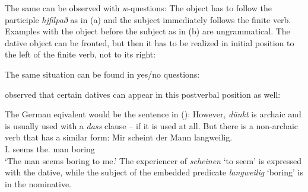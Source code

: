The same can be observed with \emph{w}-questions:
\eal
{}
\zl
The object has to follow the participle \emph{hjfilpað} as in (a) and the subject immediately
follows the finite verb. Examples with the object before the subject as in (b) are
ungrammatical. The dative object can be fronted, but then it has to be realized in initial position
to the left of the finite verb, not to its right:
\z

The same situation can be found in yes/no questions:
\eal
{}
\zl

\citet*[Section~2.3]{ZMT85a} observed that certain datives can appear in this postverbal position as well:

\eal
{}
\zl

The German eqivalent would be the sentence in ():
\z
However, \emph{dünkt} is archaic and is usually used with a \emph{dass} clause -- if it is used at
all. But there is a non-archaic verb that has a similar form:
\ea
\gll Mir scheint der Mann langweilig.\\
     I.\DAT{} seems the.\NOM{} man boring\\
\glt `The man seems boring to me.'
\z
The experiencer of \emph{scheinen} `to seem' is expressed with the dative, while the subject of the
embedded predicate \emph{langweilig} `boring' is in the nominative.



